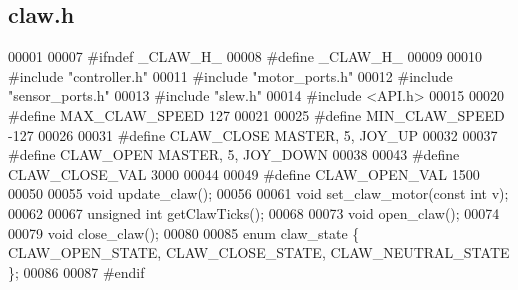 \subsection{claw.\+h}
\label{claw_8h_source}

\begin{DoxyCode}
00001 
00007 \textcolor{preprocessor}{#ifndef \_CLAW\_H\_}
00008 \textcolor{preprocessor}{#define \_CLAW\_H\_}
00009 
00010 \textcolor{preprocessor}{#include "controller.h"}
00011 \textcolor{preprocessor}{#include "motor_ports.h"}
00012 \textcolor{preprocessor}{#include "sensor_ports.h"}
00013 \textcolor{preprocessor}{#include "slew.h"}
00014 \textcolor{preprocessor}{#include <API.h>}
00015 
00020 \textcolor{preprocessor}{#define MAX\_CLAW\_SPEED 127}
00021 
00025 \textcolor{preprocessor}{#define MIN\_CLAW\_SPEED -127}
00026 
00031 \textcolor{preprocessor}{#define CLAW\_CLOSE MASTER, 5, JOY\_UP}
00032 
00037 \textcolor{preprocessor}{#define CLAW\_OPEN MASTER, 5, JOY\_DOWN}
00038 
00043 \textcolor{preprocessor}{#define CLAW\_CLOSE\_VAL 3000}
00044 
00049 \textcolor{preprocessor}{#define CLAW\_OPEN\_VAL 1500}
00050 
00055 \textcolor{keywordtype}{void} update_claw();
00056 
00061 \textcolor{keywordtype}{void} set_claw_motor(\textcolor{keyword}{const} \textcolor{keywordtype}{int} v);
00062 
00067 \textcolor{keywordtype}{unsigned} \textcolor{keywordtype}{int} getClawTicks();
00068 
00073 \textcolor{keywordtype}{void} open_claw();
00074 
00079 \textcolor{keywordtype}{void} close_claw();
00080 
00085 \textcolor{keyword}{enum} claw_state \{ CLAW_OPEN_STATE, CLAW_CLOSE_STATE, CLAW_NEUTRAL_STATE \};
00086 
00087 \textcolor{preprocessor}{#endif}
\end{DoxyCode}
